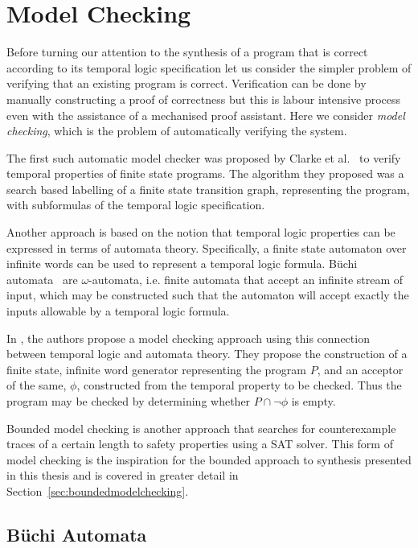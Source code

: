 \section{Model Checking}

Before turning our attention to the synthesis of a program that is correct according to its temporal logic specification let us consider the simpler problem of verifying that an existing program is correct. Verification can be done by manually constructing a proof of correctness but this is labour intensive process even with the assistance of a mechanised proof assistant. Here we consider \emph{model checking}, which is the problem of automatically verifying the system.

The first such automatic model checker was proposed by Clarke et al.~\cite{Clarke86} to verify temporal properties of finite state programs. The algorithm they proposed was a search based labelling of a finite state transition graph, representing the program, with subformulas of the temporal logic specification. 

Another approach is based on the notion that temporal logic properties can be
expressed in terms of automata theory. Specifically, a finite state automaton
over infinite words can be used to represent a temporal logic formula. B\"uchi
automata~\cite{Buchi62} are $\omega$-automata, i.e. finite automata that accept
an infinite stream of input, which may be constructed such that the automaton
will accept exactly the inputs allowable by a temporal logic formula.

In \cite{Vardi96}, the authors propose a model checking approach using this
connection between temporal logic and automata theory. They propose the
construction of a finite state, infinite word generator representing the
program $P$, and an acceptor of the same, $\phi$, constructed from the temporal
property to be checked. Thus the program may be checked by determining whether $P \cap \lnot \phi$ is empty.

Bounded model checking is another approach that searches for counterexample traces of a certain length to safety properties using a SAT solver.  This form of model checking is the inspiration for the bounded approach to synthesis presented in this thesis and is covered in greater detail in Section~\ref{sec:boundedmodelchecking}.

\subsection{B\"uchi Automata}

